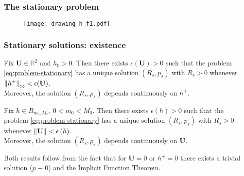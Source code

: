 \documentclass[10pt,aspectratio=169]{beamer}
\begin{document}
\begin{frame}
\frametitle{The stationary problem}

\begin{figure}[h]
	\texttt{[image: drawing\_h\_f1.pdf]}
\end{figure}

\end{frame} 


\begin{frame}
\frametitle{Stationary solutions: existence}
\begin{theorem}\label{theo:existence_U_fix}
	Fix $\mathbf{U}\in\mathbb{R}^2$ and $h_0>0$. Then there exists $\epsilon\left(\mathbf{U}\right)>0$ such that the problem \eqref{eq:problem-stationary} has a unique solution $\left(R_s,p_s\right)$ with $R_s>0$ whenever $\left\lVert h^+\right\rVert_{\infty}<\epsilon(\mathbf{U})$.\\ {\color{red}Moreover, the solution $\left(R_s,p_s\right)$ depends continuously on $h^+$}.
\end{theorem}
\begin{theorem}\label{theo:existence_h_fix}
	Fix $h\in B_{m_0,M_0}$, $0<m_0<M_0$. Then there exists $\epsilon\left(h\right)>0$ such that the problem \eqref{eq:problem-stationary} has a unique solution $\left(R_s,p_s\right)$ with $R_s>0$ whenever $\left\lVert\mathbf{U}\right\rVert_{}<\epsilon\left(h\right)$.\\  {\color{red}Moreover, the solution $\left(R_s,p_s\right)$ depends continuously on $\mathbf{U}$}.
\end{theorem}
\bigskip

Both results follow from the fact that for $\mathbf{U}=0$ or $h^+=0$ there exists a trivial solution ($p\equiv0$) and the Implicit Function Theorem.
\end{frame} 
\end{document}
